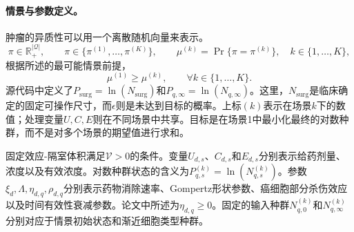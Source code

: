 \documentclass{article}
\begin{document}
\paragraph{情景与参数定义。}
肿瘤的异质性可以用一个离散随机向量来表示。
\[
\pi\in\mathbb R_+^{|\mathcal Q|},\qquad
\pi\in\{\pi^{(1)},\ldots,\pi^{(K)}\},\qquad
\mu^{(k)}=\Pr\{\pi=\pi^{(k)}\},\quad k\in\{1,\ldots,K\},
\]
根据所述的最可能情景前提，
\[
\mu^{(1)}\geq\mu^{(k)},\qquad \forall k\in\{1,\ldots,K\}.
\]
源代码中定义了$P_{\mathrm{surg}}=\ln(N_{\mathrm{surg}})$和$P_{q,\infty}=\ln(N_{q,\infty})$。这里，$N_{\mathrm{surg}}$是临床确定的固定可操作尺寸，而$\epsilon$则是未达到目标的概率。上标$(k)$表示在场景$k$下的数值；处理变量$U,C,E$则在不同场景中共享。目标是在场景1中最小化最终的对数种群，而不是对多个场景的期望值进行求和。

固定效应-隔室体积满足$\mathcal V>0$的条件。变量$U_{d,s}$、$C_{d,s}$和$E_{d,s}$分别表示给药剂量、浓度以及有效浓度。对数种群状态的含义为$P_{q,s}^{(k)}=\ln(N_{q,s}^{(k)})$。参数$\xi_d,\Lambda,\eta_{d,q},\rho_{d,q}$分别表示药物消除速率、Gompertz形状参数、癌细胞部分杀伤效应以及时间有效性衰减参数。论文中所述为$\eta_{d,q}\geq0$。固定的输入种群$N_{q,0}^{(k)}$和$N_{q,\infty}^{(k)}$分别对应于情景初始状态和渐近细胞类型种群。
\end{document}
